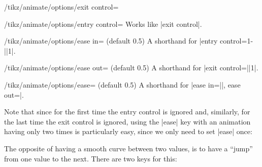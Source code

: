\begin{key}{/tikz/animate/options/exit control=}
\begin{codeexample}[animation list={0.333/\frac{1}{3},0.666/\frac{2}{3},1,1.333/1\frac{1}{3},1.666/1\frac{2}{3}}]
\end{codeexample}
\end{key}

\begin{key}{/tikz/animate/options/entry control=}
  Works like |exit control|.
\end{key}
  
\begin{key}{/tikz/animate/options/ease in= (default 0.5)}
  A shorthand for |entry control={1-||}{1}|.
\end{key}

\begin{key}{/tikz/animate/options/ease out= (default 0.5)}
  A shorthand for |exit control={||}{1}|.
\end{key}

\begin{key}{/tikz/animate/options/ease= (default 0.5)}
  A shorthand for |ease in=||, ease out=|.

  Note that since for the first time the entry control is ignored and,
  similarly, for the last time the exit control is ignored, using the
  |ease| key with an animation having only two times is particularly
  easy, since we only need to set |ease| once:

\begin{codeexample}[animation list={0.333/\frac{1}{3},0.666/\frac{2}{3},1,1.333/1\frac{1}{3},1.666/1\frac{2}{3}}]
\end{codeexample}
\end{key}


The opposite of having a smooth curve between two values, is to have
a ``jump'' from one value to the next. There are two keys for this:


